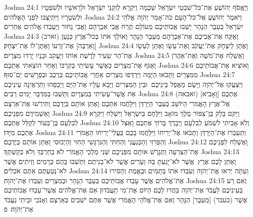 Joshua 24:1	וַיֶּאֱסֹף יְהוֹשֻׁעַ אֶת־כּל־שִׁבְטֵי יִשְׂרָאֵל שְׁכֶמָה וַיִּקְרָא לְזִקְנֵי יִשְׂרָאֵל וּלְרָאשָׁיו וּלְשֹׁפְטָיו וּלְשֹׁטְרָיו וַיִּתְיַצְּבוּ לִפְנֵי הָאֱלֹהִים׃
Joshua 24:2	וַיֹּאמֶר יְהוֹשֻׁעַ אֶל־כּל־הָעָם כֹּה־אָמַר יְהֹוָה אֱלֹהֵי יִשְׂרָאֵל בְּעֵבֶר הַנָּהָר יָשְׁבוּ אֲבוֹתֵיכֶם מֵעוֹלָם תֶּרַח אֲבִי אַבְרָהָם וַאֲבִי נָחוֹר וַיַּעַבְדוּ אֱלֹהִים אֲחֵרִים׃
Joshua 24:3	וָאֶקַּח אֶת־אֲבִיכֶם אֶת־אַבְרָהָם מֵעֵבֶר הַנָּהָר וָאוֹלֵךְ אֹתוֹ בְּכל־אֶרֶץ כְּנָעַן (וארב) [וָאַרְבֶּה] אֶת־זַרְעוֹ וָאֶתֶּן־לוֹ אֶת־יִצְחָק׃
Joshua 24:4	וָאֶתֵּן לְיִצְחָק אֶת־יַעֲקֹב וְאֶת־עֵשָׂו וָאֶתֵּן לְעֵשָׂו אֶת־הַר שֵׂעִיר לָרֶשֶׁת אוֹתוֹ וְיַעֲקֹב וּבָנָיו יָרְדוּ מִצְרָיִם׃
Joshua 24:5	וָאֶשְׁלַח אֶת־מֹשֶׁה וְאֶת־אַהֲרֹן וָאֶגֹּף אֶת־מִצְרַיִם כַּאֲשֶׁר עָשִׂיתִי בְּקִרְבּוֹ וְאַחַר הוֹצֵאתִי אֶתְכֶם׃
Joshua 24:6	וָאוֹצִיא אֶת־אֲבוֹתֵיכֶם מִמִּצְרַיִם וַתָּבֹאוּ הַיָּמָּה וַיִּרְדְּפוּ מִצְרַיִם אַחֲרֵי אֲבוֹתֵיכֶם בְּרֶכֶב וּבְפָרָשִׁים יַם־סוּף׃
Joshua 24:7	וַיִּצְעֲקוּ אֶל־יְהֹוָה וַיָּשֶׂם מַאֲפֵל בֵּינֵיכֶם  וּבֵין הַמִּצְרִים וַיָּבֵא עָלָיו אֶת־הַיָּם וַיְכַסֵּהוּ וַתִּרְאֶינָה עֵינֵיכֶם אֵת אֲשֶׁר־עָשִׂיתִי בְּמִצְרָיִם וַתֵּשְׁבוּ בַמִּדְבָּר יָמִים רַבִּים׃
Joshua 24:8	(ואבאה) [וָאָבִיא] אֶתְכֶם אֶל־אֶרֶץ הָאֱמֹרִי הַיּוֹשֵׁב בְּעֵבֶר הַיַּרְדֵּן וַיִּלָּחֲמוּ אִתְּכֶם וָאֶתֵּן אוֹתָם בְּיֶדְכֶם וַתִּירְשׁוּ אֶת־אַרְצָם וָאַשְׁמִידֵם מִפְּנֵיכֶם׃
Joshua 24:9	וַיָּקם בָּלָק בֶּן־צִפּוֹר מֶלֶךְ מוֹאָב וַיִּלָּחֶם בְּיִשְׂרָאֵל וַיִּשְׁלַח וַיִּקְרָא לְבִלְעָם בֶּן־בְּעוֹר לְקַלֵּל אֶתְכֶם׃
Joshua 24:10	וְלֹא אָבִיתִי לִשְׁמֹעַ לְבִלְעָם וַיְבָרֶךְ בָּרוֹךְ אֶתְכֶם וָאַצִּל אֶתְכֶם מִיָּדוֹ׃
Joshua 24:11	וַתַּעַבְרוּ אֶת־הַיַּרְדֵּן וַתָּבֹאוּ אֶל־יְרִיחוֹ וַיִּלָּחֲמוּ בָכֶם בַּעֲלֵי־יְרִיחוֹ הָאֱמֹרִי וְהַפְּרִזִּי וְהַכְּנַעֲנִי וְהַחִתִּי וְהַגִּרְגָּשִׁי הַחִוִּי וְהַיְבוּסִי וָאֶתֵּן אוֹתָם בְּיֶדְכֶם׃
Joshua 24:12	וָאֶשְׁלַח לִפְנֵיכֶם אֶת־הַצִּרְעָה וַתְּגָרֶשׁ אוֹתָם מִפְּנֵיכֶם שְׁנֵי מַלְכֵי הָאֱמֹרִי לֹא בְחַרְבְּךָ וְלֹא בְקַשְׁתֶּךָ׃
Joshua 24:13	וָאֶתֵּן לָכֶם אֶרֶץ  אֲשֶׁר לֹא־יָגַעְתָּ בָּהּ וְעָרִים אֲשֶׁר לֹא־בְנִיתֶם וַתֵּשְׁבוּ בָּהֶם כְּרָמִים וְזֵיתִים אֲשֶׁר לֹא־נְטַעְתֶּם אַתֶּם אֹכְלִים׃
Joshua 24:14	וְעַתָּה יְראוּ אֶת־יְהֹוָה וְעִבְדוּ אֹתוֹ בְּתָמִים וּבֶאֱמֶת וְהָסִירוּ אֶת־אֱלֹהִים אֲשֶׁר עָבְדוּ אֲבוֹתֵיכֶם בְּעֵבֶר הַנָּהָר וּבְמִצְרַיִם וְעִבְדוּ אֶת־יְהֹוָה׃
Joshua 24:15	וְאִם רַע בְּעֵינֵיכֶם לַעֲבֹד אֶת־יְהֹוָה בַּחֲרוּ לָכֶם הַיּוֹם אֶת־מִי תַעֲבֹדוּן אִם אֶת־אֱלֹהִים אֲשֶׁר־עָבְדוּ אֲבוֹתֵיכֶם אֲשֶׁר (בעבר) [מֵעֵבֶר] הַנָּהָר וְאִם אֶת־אֱלֹהֵי הָאֱמֹרִי אֲשֶׁר אַתֶּם יֹשְׁבִים בְּאַרְצָם וְאָנֹכִי וּבֵיתִי נַעֲבֹד אֶת־יְהֹוָה׃ {פ}
